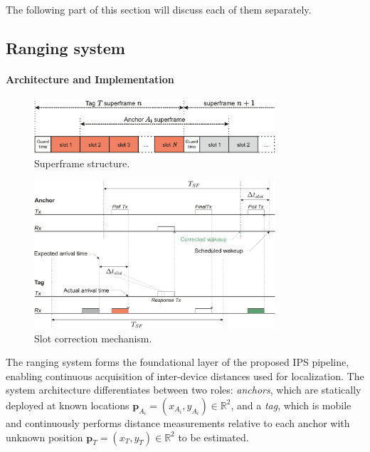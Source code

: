The following part of this section will discuss each of them separately.

\subsection{Ranging system}\label{ranging_system}

\paragraph{Architecture and Implementation}

\begin{figure}[tbh]
\includegraphics[width=0.8\textwidth]{Graphics/superframe_structure.pdf}
\centering
\caption{Superframe structure.}
\label{fig:superframe}
\end{figure}

\begin{figure}[tbh]
\includegraphics[width=0.8\textwidth]{Graphics/slot_correction.pdf}
\centering
\caption{Slot correction mechanism.}
\label{fig:slot_correction}
\end{figure}

The ranging system forms the foundational layer of the proposed IPS pipeline, enabling continuous acquisition of inter-device distances used for localization. The system architecture differentiates between two roles: \textit{anchors}, which are statically deployed at known locations $\mathbf{p}_{A_i} = (x_{A_i}, y_{A_i}) \in \mathbb{R}^2$, and a \textit{tag}, which is mobile and continuously performs distance measurements relative to each anchor with unknown position $\mathbf{p}_T = (x_T, y_T) \in \mathbb{R}^2$ to be estimated. 

